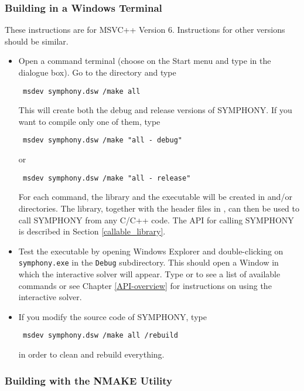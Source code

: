 \subsubsection{Building in a Windows Terminal}
\label{using_msdev}

These instructions are for MSVC++ Version 6. Instructions for other versions
should be similar.

\begin{itemize}
\item Open a command terminal (choose  on the Start menu and type
 in the dialogue box). Go to the 
directory and type 
{\color{Brown}
\begin{verbatim}
 msdev symphony.dsw /make all
\end{verbatim}
}
This will create both the debug and release versions of SYMPHONY. If you 
want to compile only one of them, type
{\color{Brown}
\begin{verbatim}
 msdev symphony.dsw /make "all - debug"
\end{verbatim}
}
or 
{\color{Brown}
\begin{verbatim}
 msdev symphony.dsw /make "all - release"
\end{verbatim}
}
For each command, the library  and the executable 
 will be created in  and/or 
directories.  The library, together with the header files in 
, can then be 
used to call SYMPHONY from any C/C++ code. The API for calling SYMPHONY is 
described in Section \ref{callable_library}.

\item Test the executable by opening Windows Explorer and double-clicking
on {\color{Brown}\texttt{symphony.exe}} in the
{\color{Brown}\texttt{Debug\bs}} subdirectory. This should open a Window in
which the interactive solver will appear. Type  or  to see
a list of available commands or see Chapter
\ref{API-overview} for instructions on using the interactive solver.

\item If you modify the source code of SYMPHONY, type 
{\color{Brown}
\begin{verbatim}
 msdev symphony.dsw /make all /rebuild
\end{verbatim}
}
in order to clean and rebuild everything.
\end{itemize} 

\subsubsection{Building with the NMAKE Utility}
\label{using_nmake}


